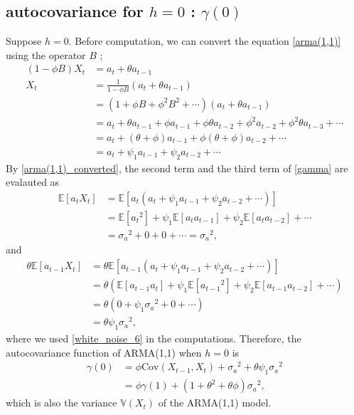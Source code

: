 \documentclass{article}
\newcommand\arma{\ensuremath{\text{ARMA}}}
\newcommand\cov{\ensuremath{\text{Cov}}}
\newcommand\sa{\ensuremath{{\sigma_a}^2}}
\begin{document}
%
\subsection{autocovariance for \(h=0\) : \(\gamma(0)\)}\label{h0}
Suppose \(h=0\).
Before computation, we can convert the equation \eqref{arma(1,1)} using the operator \(B\) ; 
\begin{equation}\label{arma(1,1)_converted}
\begin{aligned}
(1-\phi B)X_t&=a_t+\theta a_{t-1}\\
X_t&=\frac1{1-\phi B}(a_t+\theta a_{t-1})\\
&=(1+\phi B+\phi^2B^2+\cdots)(a_t+\theta a_{t-1})\\
&=a_t+\theta a_{t-1}+\phi a_{t-1}+\phi\theta a_{t-2}+\phi^2a_{t-2}+\phi^2\theta a_{t-3}+\cdots\\
&=a_t+(\theta+\phi)a_{t-1}+\phi(\theta+\phi)a_{t-2}+\cdots\\
&=a_t+\psi_1a_{t-1}+\psi_2a_{t-2}+\cdots
\end{aligned}
\end{equation}
By \eqref{arma(1,1)_converted}, the second term and the third term of \eqref{gamma} are evalauted as
\begin{align*}
\mathbb E[a_tX_t]
&=\mathbb E[a_t(a_t+\psi_1a_{t-1}+\psi_2a_{t-2}+\cdots)]\\
&=\mathbb E[{a_t}^2]+\psi_1\mathbb E[a_ta_{t-1}]+\psi_2\mathbb E[a_ta_{t-2}]+\cdots\\
&=\sa+0+0+\cdots=\sa,
\end{align*}
and
\begin{align*}
\theta\mathbb E[a_{t-1}X_t]
&=\theta\mathbb E[a_{t-1}(a_t+\psi_1a_{t-1}+\psi_2a_{t-2}+\cdots)]\\
&=\theta\left(\mathbb E[a_{t-1}a_t]+\psi_1\mathbb E[{a_{t-1}}^2]+\psi_2\mathbb E[a_{t-1}a_{t-2}]+\cdots\right)\\
&=\theta\left(0+\psi_1\sa+0+\cdots\right)\\
&=\theta\psi_1\sa,
\end{align*}
where we used \eqref{white_noise_6} in the computations.
Therefore, the autocovariance function of \arma(1,1) when \(h=0\) is
\begin{equation}\label{gamma0}
\begin{aligned}
\gamma(0)
&=\phi\cov(X_{t-1}, X_t)+\sa+\theta\psi_1\sa\\
&=\phi\gamma(1)+(1+\theta^2+\theta\phi)\sa,
\end{aligned}
\end{equation}
which is also the variance \(\mathbb V(X_t)\) of the \arma(1,1) model.
\end{document}
